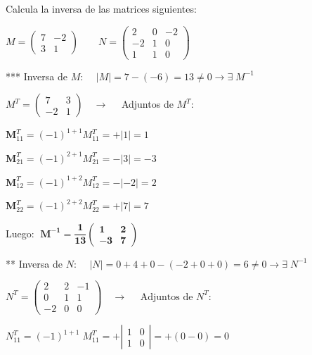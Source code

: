 \begin{ejre}
Calcula la inversa de las matrices siguientes:

$M=\left( \begin{matrix} 7&-2\\ 3&1   \end{matrix} \right) \qquad
N=\left( \begin{matrix} 2&0&-2\\-2&1&0\\1&1&0  \end{matrix} \right) $
\end{ejre}

\begin{proofw}\renewcommand{\qedsymbol}{$\diamond$}


*** Inversa de $M$:  $\quad |M|=7-(-6)=13\neq 0 \to \exists \;  M^{-1}$

\noindent $M^T=\left( \begin{matrix} 7&3\\ -2&1   \end{matrix} \right)\quad \to \quad $
Adjuntos de $M^T$:

\begin{multicols}{2}
\noindent $\boldsymbol{M}^T_{11}=(-1)^{1+1}M^T_{11}=+|1|=1$

\noindent $\boldsymbol{M}^T_{21}=(-1)^{2+1}M^T_{21}=-|3|=-3$

\noindent $\boldsymbol{M}^T_{12}=(-1)^{1+2}M^T_{12}=-|-2|=2$

\noindent $\boldsymbol{M}^T_{22}=(-1)^{2+2}M^T_{22}=+|7|=7$
\end{multicols}

\noindent Luego: $\boldsymbol{ \; M^{-1}= \dfrac 1 {13} 
\left( \begin{matrix} 1&2\\-3&7  \end{matrix} \right) \; }$

\noindent *** Inversa de $N$: $\quad |N|=0+4+0-(-2+0+0)=6\neq 0 \to \exists \; N^{-1}$

\noindent $N^T=\left( \begin{matrix} 2&2&-1\\0&1&1\\-2&0&0 \end{matrix} \right) \quad \to \quad \text{ Adjuntos de } N^T:$



\noindent $N^T_{11}=(-1)^{1+1}\; M^T_{11}=+\left| \begin{matrix} 1&0\\1&0 \end{matrix}\right| = + (0-0)= 0$


\end{proofw}
